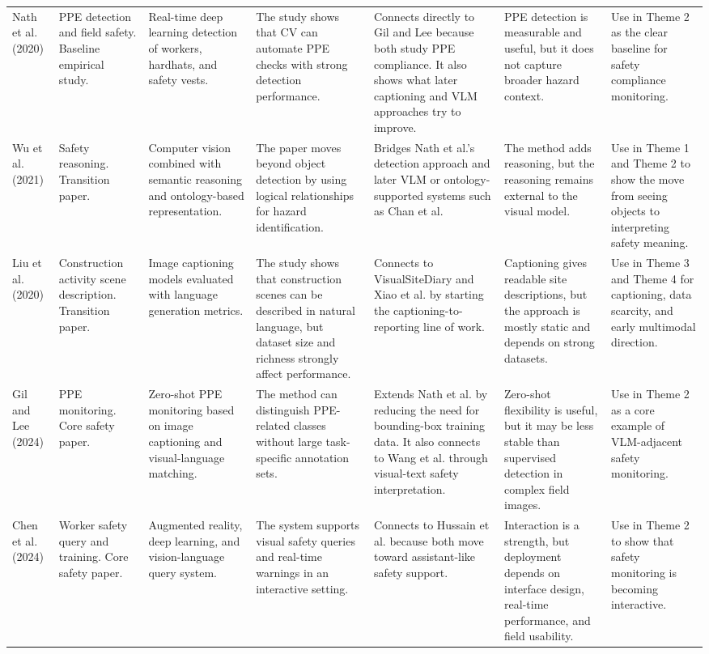 \documentclass[10pt, letterpaper]{article}
\begin{document}
\begin{landscape}
\begin{longtable}{L{3.0cm} L{2.2cm} L{2.5cm} L{2.9cm} L{3.5cm} L{3.6cm} L{3.2cm}}
Nath et al. (2020) & PPE detection and field safety. Baseline empirical study. & Real-time deep learning detection of workers, hardhats, and safety vests. & The study shows that CV can automate PPE checks with strong detection performance. & Connects directly to Gil and Lee because both study PPE compliance. It also shows what later captioning and VLM approaches try to improve. & PPE detection is measurable and useful, but it does not capture broader hazard context. & Use in Theme 2 as the clear baseline for safety compliance monitoring. \\

Wu et al. (2021) & Safety reasoning. Transition paper. & Computer vision combined with semantic reasoning and ontology-based representation. & The paper moves beyond object detection by using logical relationships for hazard identification. & Bridges Nath et al.'s detection approach and later VLM or ontology-supported systems such as Chan et al. & The method adds reasoning, but the reasoning remains external to the visual model. & Use in Theme 1 and Theme 2 to show the move from seeing objects to interpreting safety meaning. \\

Liu et al. (2020) & Construction activity scene description. Transition paper. & Image captioning models evaluated with language generation metrics. & The study shows that construction scenes can be described in natural language, but dataset size and richness strongly affect performance. & Connects to VisualSiteDiary and Xiao et al. by starting the captioning-to-reporting line of work. & Captioning gives readable site descriptions, but the approach is mostly static and depends on strong datasets. & Use in Theme 3 and Theme 4 for captioning, data scarcity, and early multimodal direction. \\

Gil and Lee (2024) & PPE monitoring. Core safety paper. & Zero-shot PPE monitoring based on image captioning and visual-language matching. & The method can distinguish PPE-related classes without large task-specific annotation sets. & Extends Nath et al. by reducing the need for bounding-box training data. It also connects to Wang et al. through visual-text safety interpretation. & Zero-shot flexibility is useful, but it may be less stable than supervised detection in complex field images. & Use in Theme 2 as a core example of VLM-adjacent safety monitoring. \\

Chen et al. (2024) & Worker safety query and training. Core safety paper. & Augmented reality, deep learning, and vision-language query system. & The system supports visual safety queries and real-time warnings in an interactive setting. & Connects to Hussain et al. because both move toward assistant-like safety support. & Interaction is a strength, but deployment depends on interface design, real-time performance, and field usability. & Use in Theme 2 to show that safety monitoring is becoming interactive. \\


\end{longtable}
\end{landscape}
\end{document}
